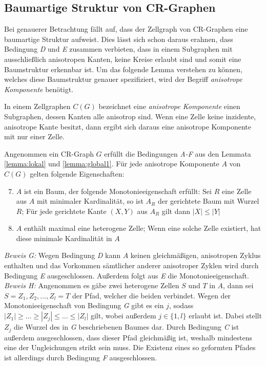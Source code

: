 \subsection{Baumartige Struktur von CR-Graphen}
Bei genauerer Betrachtung fällt auf, dass der Zellgraph von CR-Graphen eine baumartige Struktur aufweist.
Dies lässt sich schon daraus erahnen, dass Bedingung \emph{D} und \emph{E} zusammen verbieten, dass in einem Subgraphen mit ausschließlich anisotropen Kanten, keine Kreise erlaubt sind und somit eine Baumstruktur erkennbar ist.
Um das folgende Lemma verstehen zu können, welches diese Baumstruktur genauer spezifiziert, wird der Begriff \emph{anisotrope Komponente} benötigt.
\begin{Definition}
	In einem Zellgraphen $C(G)$ bezeichnet eine \emph{anisotrope Komponente} einen Subgraphen, dessen Kanten alle anisotrop sind.
	Wenn eine Zelle keine inzidente, anisotrope Kante besitzt, dann ergibt sich daraus eine anisotrope Komponente mit nur einer Zelle.
\end{Definition}

\begin{Lemma}
	Angenommen ein CR-Graph $G$ erfüllt die Bedingungen \emph{A-F} aus den Lemmata \ref{lemma:lokal} und \ref{lemma:global1}.
	Für jede anisotrope Komponente $A$ von $C(G)$ gelten folgende Eigenschaften:
	
	\begin{enumerate}[label=(\Alph*)]
		\setcounter{enumi}{6}
		\item $A$ ist ein Baum, der folgende Monotonieeigenschaft erfüllt: Sei $R$ eine Zelle aus $A$ mit minimaler Kardinalität, so ist $A_R$ der gerichtete Baum mit Wurzel $R$; Für jede gerichtete Kante $(X,Y)$ aus $A_R$ gilt dann $|X|\leq |Y|$
		\item $A$ enthält maximal eine heterogene Zelle; Wenn eine solche Zelle existiert, hat diese minimale Kardinalität in $A$
	\end{enumerate}
	\label{lemma:global2}
\end{Lemma}

\emph{Beweis G:} Wegen Bedingung \emph{D} kann $A$ keinen gleichmäßigen, anisotropen Zyklus enthalten und das Vorkommen sämtlicher anderer anisotroper Zyklen wird durch Bedingung \emph{E} ausgeschlossen. Außerdem folgt aus \emph{E} die Monotonieeigenschaft.\\

\emph{Beweis H:} Angenommen es gäbe zwei heterogene Zellen $S$ und $T$ in $A$, dann sei $S=Z_1,Z_2,...,Z_l=T$ der Pfad, welcher die beiden verbindet.
Wegen der Monotonieeigenschaft von Bedingung \emph{G} gibt es ein $j$, sodass $|Z_1|\geq ... \geq |Z_j|\leq ... \leq |Z_l|$ gilt, wobei außerdem $j\in \{1,l\}$ erlaubt ist.
Dabei stellt $Z_j$ die Wurzel des in \emph{G} beschriebenen Baumes dar.
Durch Bedingung \emph{C} ist außerdem ausgeschlossen, dass dieser Pfad gleichmäßig ist, weshalb mindestens eine der Ungleichungen strikt sein muss.
Die Existenz eines so geformten Pfades ist allerdings durch Bedingung \emph{F} ausgeschlossen.

